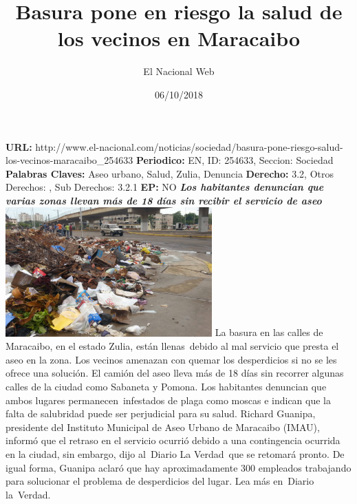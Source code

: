 \documentclass{article}%
\title{\textbf{Basura pone en riesgo la salud de los vecinos en Maracaibo}}%
\author{El Nacional Web}%
\date{06/10/2018}%
\begin{document}
%
\normalsize%
\maketitle%
\textbf{URL: }%
http://www.el{-}nacional.com/noticias/sociedad/basura{-}pone{-}riesgo{-}salud{-}los{-}vecinos{-}maracaibo\_254633\newline%
%
\textbf{Periodico: }%
EN, %
ID: %
254633, %
Seccion: %
Sociedad\newline%
%
\textbf{Palabras Claves: }%
Aseo urbano, Salud, Zulia, Denuncia\newline%
%
\textbf{Derecho: }%
3.2, %
Otros Derechos: %
, %
Sub Derechos: %
3.2.1\newline%
%
\textbf{EP: }%
NO\newline%
\newline%
%
\textbf{\textit{Los habitantes denuncian que varias zonas llevan más de 18 días sin recibir el servicio de aseo}}%
\newline%
\newline%
%
\includegraphics[width=300px]{117.jpg}%
\newline%
%
La basura en las calles de Maracaibo, en el estado Zulia, están llenas~debido al mal servicio que presta el aseo en la zona. Los vecinos amenazan con quemar los desperdicios si no se les ofrece una solución.%
\newline%
%
El camión del aseo lleva más de 18 días sin recorrer algunas calles de la ciudad como Sabaneta y Pomona. Los habitantes denuncian que ambos lugares permanecen~infestados de plaga como moscas e indican que la falta de salubridad puede ser perjudicial para su salud.%
\newline%
%
Richard Guanipa, presidente del Instituto Municipal de Aseo Urbano de Maracaibo (IMAU), informó que el retraso en el servicio ocurrió debido a una contingencia ocurrida en la ciudad, sin embargo, dijo al~Diario La Verdad~que se retomará pronto.%
\newline%
%
De igual forma, Guanipa aclaró que hay aproximadamente 300 empleados trabajando para solucionar el problema de desperdicios del lugar.%
\newline%
%
Lea más en~Diario la~Verdad.%
\newline%
%
\end{document}
